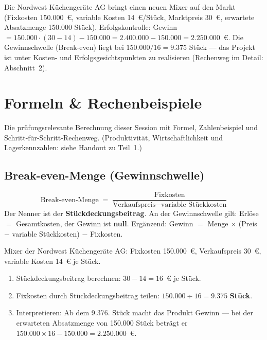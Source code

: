 \documentclass[11pt, a4paper]{article}
\begin{document}
\begin{beispiel}
Die Nordwest Küchengeräte AG bringt einen neuen Mixer auf den Markt (Fixkosten
150.000~€, variable Kosten 14~€/Stück, Marktpreis 30~€, erwartete Absatzmenge
150.000 Stück). Erfolgskontrolle: Gewinn $= 150.000 \cdot (30 - 14) - 150.000 =
2.400.000 - 150.000 = 2.250.000$~€. Die Gewinnschwelle (Break-even) liegt bei
$150.000 / 16 = 9.375$ Stück --- das Projekt ist unter Kosten- und
Erfolgsgesichtspunkten zu realisieren (Rechenweg im Detail: Abschnitt~2).
\end{beispiel}

\section{Formeln \& Rechenbeispiele}

Die prüfungsrelevante Berechnung dieser Session mit Formel, Zahlenbeispiel und
Schritt-für-Schritt-Rechenweg. (Produktivität, Wirtschaftlichkeit und Lagerkennzahlen:
siehe Handout zu Teil~1.)

\subsection{Break-even-Menge (Gewinnschwelle)}

\begin{merksatz}[title={\bfseries Formel: Break-even-Menge}]
\[
\text{Break-even-Menge} \;=\; \frac{\text{Fixkosten}}{\text{Verkaufspreis} - \text{variable Stückkosten}}
\]
Der Nenner ist der \textbf{Stückdeckungsbeitrag}. An der Gewinnschwelle gilt:
Erlöse $=$ Gesamtkosten, der Gewinn ist \textbf{null}. Ergänzend:
Gewinn $=$ Menge $\times$ (Preis $-$ variable Stückkosten) $-$ Fixkosten.
\end{merksatz}

\begin{beispiel}
Mixer der Nordwest Küchengeräte AG: Fixkosten 150.000~€, Verkaufspreis 30~€,
variable Kosten 14~€ je Stück.
\begin{enumerate}
  \item Stückdeckungsbeitrag berechnen: $30 - 14 = 16$~€ je Stück.
  \item Fixkosten durch Stückdeckungsbeitrag teilen:
    $150.000 \div 16 = 9.375$ \textbf{Stück}.
  \item Interpretieren: Ab dem 9.376. Stück macht das Produkt Gewinn --- bei der
    erwarteten Absatzmenge von 150.000 Stück beträgt er
    $150.000 \times 16 - 150.000 = 2.250.000$~€.
\end{enumerate}
\end{beispiel}
\end{document}
